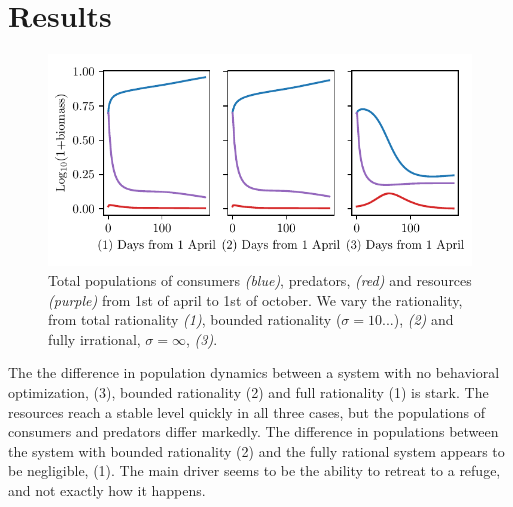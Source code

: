 \section{Results}


\begin{figure}[H]
\includegraphics{plots/populations.pdf}
\caption{Total populations of consumers \emph{(blue)}, predators, \emph{(red)} and resources \emph{(purple)} from 1st of april to 1st of october. We vary the rationality, from total rationality \emph{(1)}, bounded rationality ($\sigma = 10...$), \emph{(2)} and fully irrational, $\sigma = \infty$, \emph{(3)}.}
\label{fig:long_term_populations}
\end{figure}
The the difference in population dynamics between a system with no behavioral optimization, (3), bounded rationality (2) and full rationality (1) is stark. The resources reach a stable level quickly in all three cases, but the populations of consumers and predators differ markedly. The difference in populations between the system with bounded rationality (2) and the fully rational system appears to be negligible, (1). The main driver seems to be the ability to retreat to a refuge, and not exactly how it happens.
